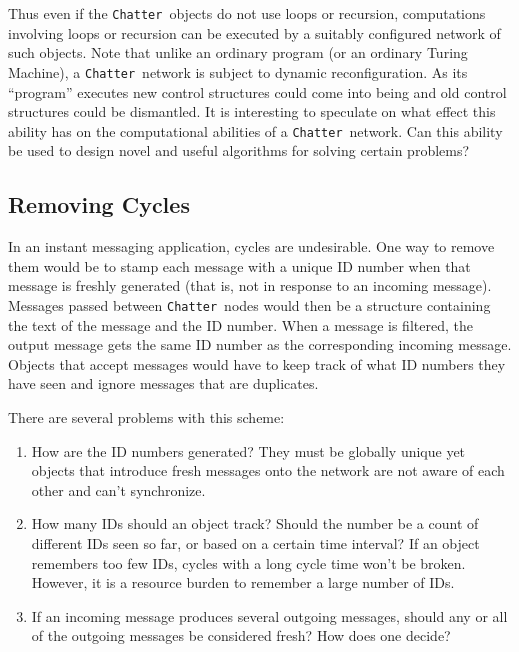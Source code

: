\documentclass[twocolumn]{article}
\newcommand{\Chatter}{\texttt{Chatter}}
\begin{document}
Thus even if the \Chatter\ objects do not use loops or recursion, computations involving loops
or recursion can be executed by a suitably configured network of such objects. Note that unlike
an ordinary program (or an ordinary Turing Machine), a \Chatter\ network is subject to dynamic
reconfiguration. As its ``program'' executes new control structures could come into being and
old control structures could be dismantled. It is interesting to speculate on what effect this
ability has on the computational abilities of a \Chatter\ network. Can this ability be used to
design novel and useful algorithms for solving certain problems?

\subsection{Removing Cycles}

In an instant messaging application, cycles are undesirable. One way to remove them would be to
stamp each message with a unique ID number when that message is freshly generated (that is, not
in response to an incoming message). Messages passed between \Chatter\ nodes would then be a
structure containing the text of the message and the ID number. When a message is filtered, the
output message gets the same ID number as the corresponding incoming message. Objects that
accept messages would have to keep track of what ID numbers they have seen and ignore messages
that are duplicates.

There are several problems with this scheme:

\begin{enumerate}

\item How are the ID numbers generated? They must be globally unique yet objects that introduce
  fresh messages onto the network are not aware of each other and can't synchronize.

\item How many IDs should an object track? Should the number be a count of different IDs seen so
  far, or based on a certain time interval? If an object remembers too few IDs, cycles with a
  long cycle time won't be broken. However, it is a resource burden to remember a large number
  of IDs.

\item If an incoming message produces several outgoing messages, should any or all of the
  outgoing messages be considered fresh? How does one decide?

\end{enumerate}
\end{document}
